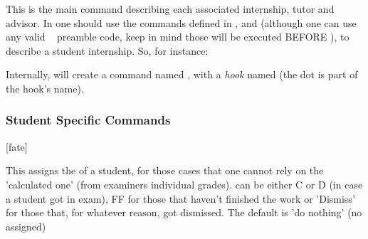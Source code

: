 \documentclass[article,nogeometry,english,tocdepth=3,secdepth=3]{ufrgscca} %
\begin{document}
\begin{codedescribe}{\NewInternshipStudent}
    \begin{codesyntax}%
    \end{codesyntax}
    This is the main command describing each  associated internship, tutor and advisor. In  one should use the commands defined in , and  (although one can use  any valid \LaTeXe~ preamble code, keep in mind those will be executed BEFORE \tsmacro{\begin{document}}{}), to describe a student internship.
        So, for instance:
        \begin{codestore}[st=d.newstudentB]
        \end{codestore}

\begin{tsremark}[N.B.:]
         Internally, \tsmacro{\NewInternshipStudent}{} will create a command named \tsmacro{\studentname}{}, with a \emph{hook} named  (the dot is part of the hook's name).
\end{tsremark}         
    \end{codedescribe}


\subsubsection{Student Specific Commands}\label{student-specific-commands}
\begin{codedescribe}{\studentFate}
	\begin{codesyntax}%
		\tsmacro{\studentFate}[fate]{}
	\end{codesyntax}
This assigns the  of a student, for those cases that one cannot rely on the 'calculated one' (from examiners individual grades).  can be either C or D (in case a student got in exam), FF for those that haven't finished the work or 'Dismiss' for those that, for whatever reason, got dismissed. The default is 'do nothing' (no  assigned)
\end{codedescribe}
\end{document}

